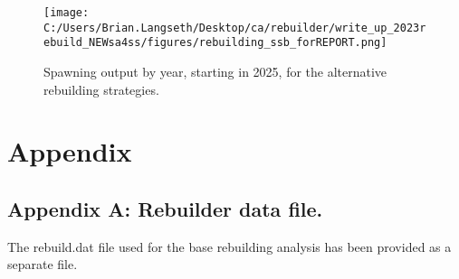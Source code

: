\documentclass[11pt,
  letterpaper,
]{article}
\begin{document}
\begin{figure}
\centering
\texttt{[image: C:/Users/Brian.Langseth/Desktop/ca/rebuilder/write\_up\_2023rebuild\_NEWsa4ss/figures/rebuilding\_ssb\_forREPORT.png]}
\caption{Spawning output by year, starting in 2025, for the alternative rebuilding strategies.\label{fig:ssb-fig}}
\end{figure}

\clearpage

\clearpage

\hypertarget{appendix}{%
\section{Appendix}\label{appendix}}

\hypertarget{append_a}{%
\subsection{Appendix A: Rebuilder data file.}\label{append_a}}

The rebuild.dat file used for the base rebuilding analysis has been provided as a separate file.

\clearpage
\end{document}
